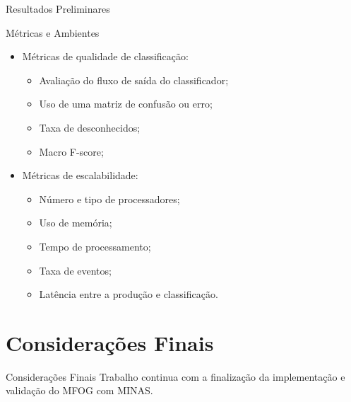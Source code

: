 \documentclass[aspectratio=43,10pt]{beamer}
\begin{document}
\begin{frame}[fragile]{Resultados Preliminares}
  \begin{alertblock}{Métricas e Ambientes}
    \begin{itemize}
      \item Métricas de qualidade de classificação:
      \begin{itemize}
        \item Avaliação do fluxo de saída do classificador;
        \item Uso de uma matriz de confusão ou erro;
        \item Taxa de desconhecidos;
        \item Macro F-score;
      \end{itemize}
      \item Métricas de escalabilidade:
      \begin{itemize}
        \item Número e tipo de processadores;
        \item Uso de memória;
        \item Tempo de processamento;
        \item Taxa de eventos;
        \item Latência entre a produção e classificação.
      \end{itemize}
    \end{itemize}
  \end{alertblock}
\end{frame}

\section{Considerações Finais}
\begin{frame}{Considerações Finais}
Trabalho continua com a finalização da implementação e validação do MFOG com MINAS.
\end{frame}
\end{document}

